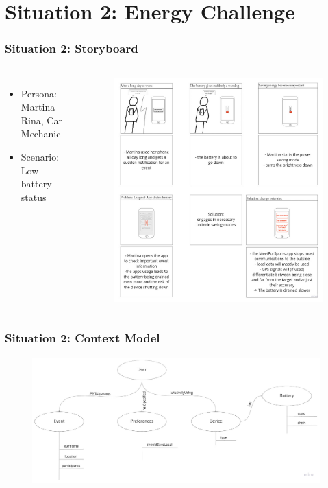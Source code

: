 \documentclass[aspectratio=169]{beamer}
\begin{document}
\section{Situation 2:  Energy Challenge}
\begin{frame}   
	\frametitle{Situation 2:  Storyboard}
	\begin{columns}
		\begin{itemize}
			\item Persona: Martina Rina, Car Mechanic
			\item Scenario: Low battery status
		\end{itemize}
		 \begin{figure}
			\centering
			\includegraphics[width=1\textwidth]{media/storyboard2.jpg}
		\end{figure}
	\end{columns}
\end{frame}

\begin{frame}
	\frametitle{Situation 2: Context Model}
	 \begin{figure}
		\centering
		\includegraphics[width=0.99\textwidth]{media/contextmodel2.jpg}
	\end{figure}
\end{frame}
\end{document}
